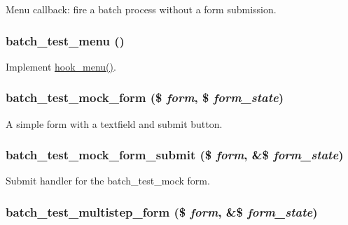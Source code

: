 \label{batch__test_8module_a61e2159da3c242f090bdddb92a0a9977}
Menu callback: fire a batch process without a form submission. \hypertarget{batch__test_8module_a28889fc66f995e44f0182c17f456f055}{
\subsubsection[{batch\_\-test\_\-menu}]{\setlength{\rightskip}{0pt plus 5cm}batch\_\-test\_\-menu ()}}
\label{batch__test_8module_a28889fc66f995e44f0182c17f456f055}
Implement \hyperlink{group__hooks_ga5c95244fea59b25666e409759e133ded}{hook\_\-menu()}. \hypertarget{batch__test_8module_a1c7182cba99db81cb139b63d13ff0cba}{
\subsubsection[{batch\_\-test\_\-mock\_\-form}]{\setlength{\rightskip}{0pt plus 5cm}batch\_\-test\_\-mock\_\-form (\$ {\em form}, \/  \$ {\em form\_\-state})}}
\label{batch__test_8module_a1c7182cba99db81cb139b63d13ff0cba}
A simple form with a textfield and submit button. \hypertarget{batch__test_8module_ad3450e5ac793400df8fda5f388e994d5}{
\subsubsection[{batch\_\-test\_\-mock\_\-form\_\-submit}]{\setlength{\rightskip}{0pt plus 5cm}batch\_\-test\_\-mock\_\-form\_\-submit (\$ {\em form}, \/  \&\$ {\em form\_\-state})}}
\label{batch__test_8module_ad3450e5ac793400df8fda5f388e994d5}
Submit handler for the batch\_\-test\_\-mock form. \hypertarget{batch__test_8module_a27849d728f8dc56be2efe444f247a20f}{
\subsubsection[{batch\_\-test\_\-multistep\_\-form}]{\setlength{\rightskip}{0pt plus 5cm}batch\_\-test\_\-multistep\_\-form (\$ {\em form}, \/  \&\$ {\em form\_\-state})}}
